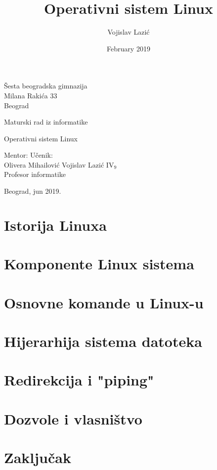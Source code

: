\documentclass[12pt,twoside,a4paper]{article}
\title{Operativni sistem Linux}
\author{Vojislav Lazić}
\date{February 2019}
\begin{document}
    \thispagestyle{empty}
    \noindent
    Šesta beogradska gimnazija\\
    Milana Rakića 33\\
    Beograd
    \vfill
    \begin{center}
        \begin{Large}
        Maturski rad iz informatike\\
        \bigskip 
        \end{Large}
        {\Huge
        Operativni sistem Linux}
    \end{center}
    \vfill
    \noindent Mentor: \hfill Učenik:\\
    Olivera Mihailović \hfill Vojislav Lazić IV$_{9}$\\
    Profesor informatike
    \vfill
    \begin{center}
        Beograd, jun 2019.
    \end{center}
\thispagestyle{empty}
\newpage
\renewcommand{\contentsname}{Sadržaj}
\tableofcontents
\newpage
\section{Istorija Linuxa}

\newpage
\section{Komponente Linux sistema}

\newpage
\section{Osnovne komande u Linux-u}

\newpage
\section{Hijerarhija sistema datoteka}

\newpage
\section{Redirekcija i "piping"}

\newpage
\section{Dozvole i vlasništvo}

\newpage
\section{Zaključak}


\nocite{linfo}
\nocite{tldp}
\newpage
\renewcommand\refname{Literatura}


\newpage

\end{document}
